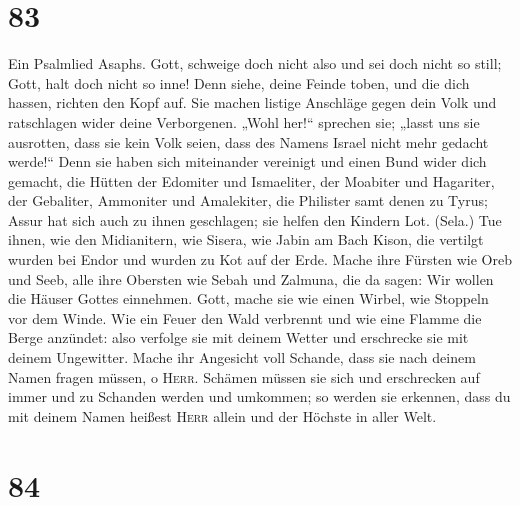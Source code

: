 \hypertarget{section-82}{%
\section{83}\label{section-82}}

 Ein Psalmlied Asaphs.  Gott, schweige doch
nicht also und sei doch nicht so still; Gott, halt doch nicht so inne!
 Denn siehe, deine Feinde toben, und die dich hassen,
richten den Kopf auf.  Sie machen listige Anschläge gegen
dein Volk und ratschlagen wider deine Verborgenen.  „Wohl
her!{}`` sprechen sie; „lasst uns sie ausrotten, dass sie kein Volk
seien, dass des Namens Israel nicht mehr gedacht werde!{}``
 Denn sie haben sich miteinander vereinigt und einen Bund
wider dich gemacht,  die Hütten der Edomiter und
Ismaeliter, der Moabiter und Hagariter,  der Gebaliter,
Ammoniter und Amalekiter, die Philister samt denen zu Tyrus;
 Assur hat sich auch zu ihnen geschlagen; sie helfen den
Kindern Lot. (Sela.)  Tue ihnen, wie den Midianitern, wie
Sisera, wie Jabin am Bach Kison,  die vertilgt wurden bei
Endor und wurden zu Kot auf der Erde.  Mache ihre Fürsten
wie Oreb und Seeb, alle ihre Obersten wie Sebah und Zalmuna,
 die da sagen: Wir wollen die Häuser Gottes einnehmen.
 Gott, mache sie wie einen Wirbel, wie Stoppeln vor dem
Winde.  Wie ein Feuer den Wald verbrennt und wie eine
Flamme die Berge anzündet:  also verfolge sie mit deinem
Wetter und erschrecke sie mit deinem Ungewitter.  Mache
ihr Angesicht voll Schande, dass sie nach deinem Namen fragen müssen, o
\textsc{Herr}.  Schämen müssen sie sich und erschrecken
auf immer und zu Schanden werden und umkommen;  so werden
sie erkennen, dass du mit deinem Namen heißest \textsc{Herr} allein und
der Höchste in aller Welt.

\hypertarget{section-83}{%
\section{84}\label{section-83}}

